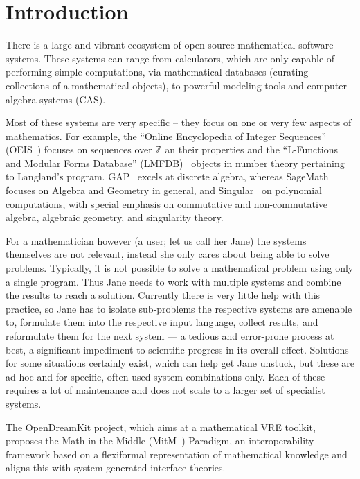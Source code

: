 \section{Introduction}\label{sec:intro}

There is a large and vibrant ecosystem of open-source mathematical software systems. 
These systems can range from calculators, which are only capable of performing simple computations, via mathematical databases (curating collections of a mathematical objects), to powerful modeling tools and computer algebra systems (CAS).

Most of these systems are very specific -- they focus on one or very few aspects of mathematics. 
For example, the ``Online Encyclopedia of Integer Sequences'' (OEIS~\cite{Sloane:oeis12,oeis}) focuses on sequences over $\mathbb{Z}$ an their properties and the ``L-Functions and Modular Forms Database'' (LMFDB)~\cite{Cremona:LMFDB16,lmfdb:on} objects in number theory pertaining to Langland's program. 
GAP~\cite{GAP:on} excels at discrete algebra, whereas SageMath~\cite{SageMath:on} focuses on Algebra and Geometry in general, and Singular~\cite{singular:on} on polynomial computations, with special emphasis on commutative and non-commutative algebra, algebraic geometry, and singularity theory.

For a mathematician however (a user; let us call her Jane) the systems themselves are not relevant, instead she only cares about being able to solve problems. 
Typically, it is not possible to solve a mathematical problem using only a single program. 
Thus Jane needs to work with multiple systems and combine the results to reach a solution. 
Currently there is very little help with this practice, so Jane has to isolate sub-problems the respective systems are amenable to, formulate them into the respective input language, collect results, and reformulate them for the next system --- a tedious and error-prone process at best, a significant impediment to scientific progress in its overall effect. 
Solutions for some situations certainly exist, which can help get Jane unstuck, but these are ad-hoc and for specific, often-used system combinations only. 
Each of these requires a lot of maintenance and does not scale to a larger set of specialist systems. 

The OpenDreamKit project, which aims at a mathematical VRE toolkit, proposes the Math-in-the-Middle (MitM~\cite{DehKohKon:iop16}) Paradigm, an interoperability framework based on a flexiformal
representation of mathematical knowledge and aligns this with system-generated interface theories. 

